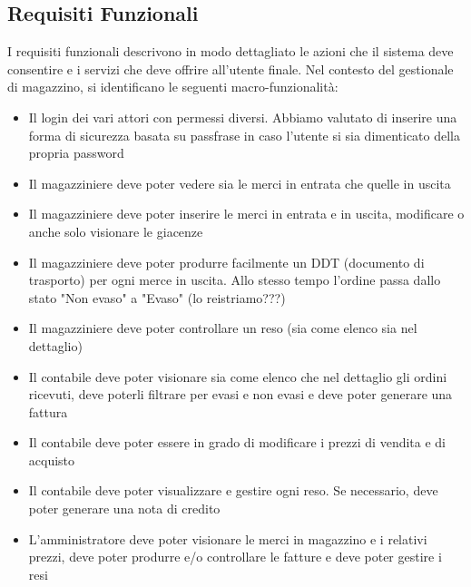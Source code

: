 \documentclass[a4paper,12pt]{article}
\begin{document}
	\subsection{Requisiti Funzionali}
	I requisiti funzionali descrivono in modo dettagliato le azioni che il sistema deve consentire e i servizi che deve offrire all'utente finale. Nel contesto del gestionale di magazzino, si 
	identificano le seguenti macro-funzionalità:
	\begin{itemize}
		\item Il login dei vari attori con permessi diversi. Abbiamo valutato di inserire una forma di sicurezza basata su passfrase in caso l'utente si sia dimenticato della propria password
		\item Il magazziniere deve poter vedere sia le merci in entrata che quelle in uscita
		\item Il magazziniere deve poter inserire le merci in entrata e in uscita, modificare o anche solo visionare le giacenze
		\item Il magazziniere deve poter produrre facilmente un DDT (documento di trasporto) per ogni merce in uscita. Allo stesso tempo l'ordine passa dallo stato "Non evaso" a "Evaso" (lo reistriamo???)
		\item Il magazziniere deve poter controllare un reso (sia come elenco sia nel dettaglio)
		\item Il contabile deve poter visionare sia come elenco che nel dettaglio gli ordini ricevuti, deve poterli filtrare per evasi e non evasi e deve poter generare una fattura
		\item Il contabile deve poter essere in grado di modificare i prezzi di vendita e di acquisto
		\item Il contabile deve poter visualizzare e gestire ogni reso. Se necessario, deve poter generare una nota di credito 
		\item L'amministratore deve poter visionare le merci in magazzino e i relativi prezzi, deve poter produrre e/o controllare le fatture e deve poter gestire i resi 
	\end{itemize}
	
\end{document}

